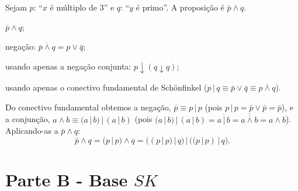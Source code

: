 \begin{solution}
Sejam $p$: ``$x$ é múltiplo de 3'' e $q$: ``$y$ é primo''. A proposição é $\bar{p}\land q$.
\begin{Qlist}
\item[(a)] $\bar{p}\land q$;
\item[(b)] negação: $\overline{\bar{p}\land q} = p\vee\bar{q}$;
\item[(c)] usando apenas a negação conjunta: $p\downarrow(q\downarrow q)$;
\item[(d)] usando apenas o conectivo fundamental de Schönfinkel ($p\,|\,q \equiv \bar{p}\vee\bar{q} \equiv \overline{p\land q}$).

Do conectivo fundamental obtemos a negação, $\bar{p} \equiv p\,|\,p$ (pois $p\,|\,p = \bar{p}\vee\bar{p} = \bar{p}$), e a conjunção, $a\land b \equiv (a\,|\,b)\,|\,(a\,|\,b)$ (pois $(a\,|\,b)\,|\,(a\,|\,b) = \overline{a\,|\,b} = \overline{\overline{a\land b}} = a\land b$). Aplicando-as a $\bar{p}\land q$:
\[
\bar{p}\land q = (p\,|\,p)\land q = \bigl((p\,|\,p)\,|\,q\bigr)\,|\,\bigl((p\,|\,p)\,|\,q\bigr).
\]
\end{Qlist}
\end{solution}

\section*{Parte B - Base $SK$}

